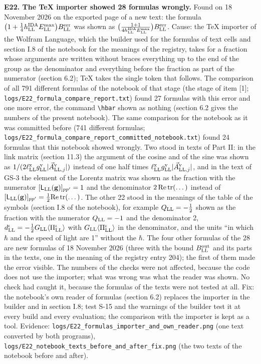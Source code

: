 \documentclass[
  10pt,
]{article}
\begin{document}
\textbf{E22. The TeX importer showed 28 formulas wrongly.} Found on 18
November 2026 on the exported page of a new text: the formula
\(\big(1+\tfrac14h^{\rm IDA}_{\rm LL}E^{\rm max}_{\rm LL}\big)B^{\rm err}_{\rm LL}\)
was shown as
\(\big(\frac{1+1}{4h^{\rm IDA}_{\rm LL}E^{\rm max}_{\rm LL}}\big)B^{\rm err}_{\rm LL}\).
Cause: the TeX importer of the Wolfram Language, which the builder used
for the formulas of text cells and section I.8 of the notebook for the
meanings of the registry, takes for a fraction whose arguments are
written without braces everything up to the end of the group as the
denominator and everything before the fraction as part of the numerator
(section 6.2); TeX takes the single token that follows. The comparison
of all 791 different formulas of the notebook of that stage (the stage
of item {[}1{]}; \texttt{logs/E22\_formula\_compare\_report.txt}) found
27 formulas with this error and one more error, the command
\texttt{\textbackslash{}hbar} shown as nothing (section 6.2 gives the
numbers of the present notebook). The same comparison for the notebook
as it was committed before (741 different formulas;
\texttt{logs/E22\_formula\_compare\_report\_committed\_notebook.txt})
found 24 formulas that this notebook showed wrongly. Two stood in texts
of Part II: in the link matrix (section 11.3) the argument of the cosine
and of the sine was shown as
\(1/(2\ell^{\rm x}_{\rm LL}g^{\rm v}_{\rm LL}\lvert\vec A^{\rm v}_{{\rm LL},j}\rvert)\)
instead of one half times
\(\ell^{\rm x}_{\rm LL}g^{\rm v}_{\rm LL}\lvert\vec A^{\rm v}_{{\rm LL},j}\rvert\),
and in the text of GS-3 the element of the Lorentz matrix was shown as
the fraction with the numerator
\([\mathsf L_{\rm LL}(\mathbf g)]_{pp'}=1\) and the denominator
\(2\,{\rm Re}\,{\rm tr}(\dots)\) instead of
\([\mathsf L_{\rm LL}(\mathbf g)]_{pp'}=\tfrac12{\rm Re}\,{\rm tr}(\dots)\).
The other 22 stood in the meanings of the table of the symbols (section
I.8 of the notebook), for example \(Q_{\rm LL}=-\tfrac12\) shown as the
fraction with the numerator \(Q_{\rm LL}=-1\) and the denominator 2,
\(d^\iota_{\rm LL}=-\tfrac12G_{\rm LL}\langle\Pi^\iota_{\rm LL}\rangle\)
with \(G_{\rm LL}\langle\Pi^\iota_{\rm LL}\rangle\) in the denominator,
and the units ``in which \(\hbar\) and the speed of light are 1''
without the \(\hbar\). The four other formulas of the 28 are new
formulas of 18 November 2026 (three with the bound
\(B^{\rm out}_{\rm LL}\) and its parts in the texts, one in the meaning
of the registry entry 204); the first of them made the error visible.
The numbers of the checks were not affected, because the code does not
use the importer; what was wrong was what the reader was shown. No check
had caught it, because the formulas of the texts were not tested at all.
Fix: the notebook's own reader of formulas (section 6.2) replaces the
importer in the builder and in section I.8; test S-15 and the warnings
of the builder test it at every build and every evaluation; the
comparison with the importer is kept as a tool. Evidence:
\texttt{logs/E22\_formulas\_importer\_and\_own\_reader.png} (one text
converted by both programs),
\texttt{logs/E22\_notebook\_texts\_before\_and\_after\_fix.png} (the two
texts of the notebook before and after).
\end{document}
